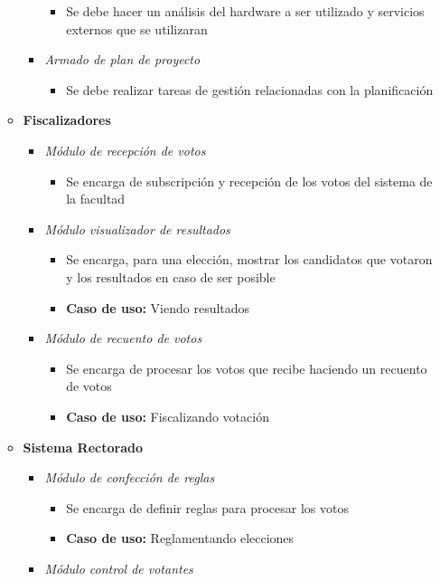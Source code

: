 \begin{itemize}
\begin{itemize}
\begin{itemize}
\begin{itemize}
 \item Se debe hacer un análisis del hardware a ser utilizado y servicios externos que se utilizaran
\end{itemize}
 \item \emph{Armado de plan de proyecto}
\begin{itemize}
 \item Se debe realizar tareas de gestión relacionadas con la planificación
\end{itemize}
\end{itemize}
 \item {\bf Fiscalizadores}
\begin{itemize}
 \item \emph{M\'odulo de recepción de votos}
\begin{itemize}
 \item Se encarga de subscripción y recepción de los votos del sistema de la facultad
\end{itemize}
 \item \emph{M\'odulo visualizador de resultados}
\begin{itemize}
 \item Se encarga, para una elección, mostrar los candidatos que votaron y los resultados en caso de ser posible
 \item {\bf Caso de uso:} Viendo resultados
\end{itemize}
 \item \emph{M\'odulo de recuento de votos}
\begin{itemize}
 \item Se encarga de procesar los votos que recibe haciendo un recuento de votos
 \item {\bf Caso de uso:} Fiscalizando votaci\'on
\end{itemize}
\end{itemize}
 \item {\bf Sistema Rectorado}
\begin{itemize}
 \item \emph{M\'odulo de confección de reglas}
\begin{itemize}
 \item Se encarga de definir reglas para procesar los votos
 \item {\bf Caso de uso:} Reglamentando elecciones
\end{itemize}
 \item \emph{M\'odulo control de votantes}
\begin{itemize}

\end{itemize}
\end{itemize}
\end{itemize}
\end{itemize}
